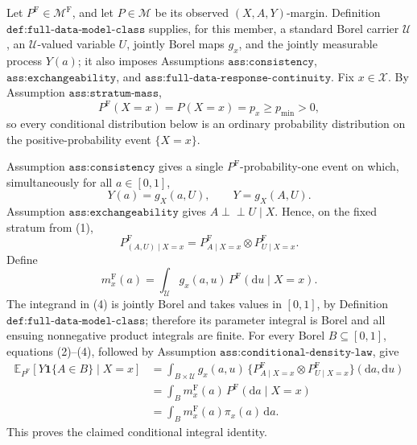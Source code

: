 Let \(P^{\mathrm F}\in\mathcal M^{\mathrm F}\), and let \(P\in\mathcal M\) be its observed \((X,A,Y)\)-margin.  Definition \(\texttt{def:full-data-model-class}\) supplies, for this member, a standard Borel carrier \(\mathcal U\), an \(\mathcal U\)-valued variable \(U\), jointly Borel maps \(g_x\), and the jointly measurable process \(Y(a)\); it also imposes Assumptions \(\texttt{ass:consistency}\), \(\texttt{ass:exchangeability}\), and \(\texttt{ass:full-data-response-continuity}\).  Fix \(x\in\mathcal X\).  By Assumption \(\texttt{ass:stratum-mass}\),
\[
 P^{\mathrm F}(X=x)=P(X=x)=p_x\geq p_{\min}>0,
 \tag{1}
\]
so every conditional distribution below is an ordinary probability distribution on the positive-probability event \(\{X=x\}\).

Assumption \(\texttt{ass:consistency}\) gives a single \(P^{\mathrm F}\)-probability-one event on which, simultaneously for all \(a\in[0,1]\),
\[
 Y(a)=g_X(a,U),
 \qquad
 Y=g_X(A,U).
 \tag{2}
\]
Assumption \(\texttt{ass:exchangeability}\) gives \(A\mathbin{\perp\!\!\!\perp}U\mid X\).  Hence, on the fixed stratum from (1),
\[
 P^{\mathrm F}_{(A,U)\mid X=x}
 =P^{\mathrm F}_{A\mid X=x}\otimes P^{\mathrm F}_{U\mid X=x}.
 \tag{3}
\]
Define
\[
 m_x^{\mathrm F}(a)
 =\int_{\mathcal U}g_x(a,u)\,P^{\mathrm F}(\mathrm du\mid X=x).
 \tag{4}
\]
The integrand in (4) is jointly Borel and takes values in \([0,1]\), by Definition \(\texttt{def:full-data-model-class}\); therefore its parameter integral is Borel and all ensuing nonnegative product integrals are finite.  For every Borel \(B\subseteq[0,1]\), equations (2)--(4), followed by Assumption \(\texttt{ass:conditional-density-law}\), give
\[
\begin{aligned}
 \mathbb E_{P^{\mathrm F}}[Y\mathbf 1\{A\in B\}\mid X=x]
 &=\int_{B\times\mathcal U}g_x(a,u)\,
   \{P^{\mathrm F}_{A\mid X=x}\otimes P^{\mathrm F}_{U\mid X=x}\}
   (\mathrm da,\mathrm du)\\
 &=\int_Bm_x^{\mathrm F}(a)\,P^{\mathrm F}(\mathrm da\mid X=x)\\
 &=\int_Bm_x^{\mathrm F}(a)\pi_x(a)\,\mathrm da.
\end{aligned}
\tag{5}
\]
This proves the claimed conditional integral identity.

